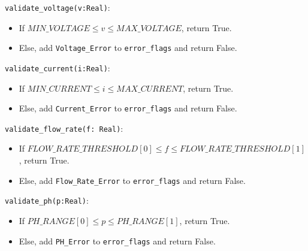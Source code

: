 \documentclass[12pt, titlepage]{article}
\begin{document}
\begin{description}
\begin{description}
\begin{description}
  \item[Access Routine Semantics:]
  \item
  \lstinline{validate_voltage(v:Real)}:
  \item
  \begin{itemize}
    \item If $MIN\_VOLTAGE \leq v \leq MAX\_VOLTAGE$, return True.
  \end{itemize}
  \item
  \begin{itemize}
    \item Else, add \lstinline{Voltage_Error} to \lstinline{error_flags} and return False.
  \end{itemize}
  \item 

  \lstinline{validate_current(i:Real)}:
  \item
  \begin{itemize}
    \item If $MIN\_CURRENT \leq i \leq MAX\_CURRENT$, return True.
  \end{itemize}
  \item
  \begin{itemize}
    \item Else, add \lstinline{Current_Error} to \lstinline{error_flags} and return False.
  \end{itemize}
  \item 

  \lstinline{validate_flow_rate(f: Real)}:
  \item
  \begin{itemize}
    \item If $FLOW\_RATE\_THRESHOLD[0] \leq f \leq FLOW\_RATE\_THRESHOLD[1]$, return True.
  \end{itemize}
  \item
  \begin{itemize}
    \item Else, add \lstinline{Flow_Rate_Error} to \lstinline{error_flags} and return False.
  \end{itemize}
  \item 

  \lstinline{validate_ph(p:Real)}:
  \item
  \begin{itemize}
    \item If $PH\_RANGE[0] \leq p \leq PH\_RANGE[1]$, return True.
  \end{itemize}
  \item
  \begin{itemize}
    \item Else, add \lstinline{PH_Error} to \lstinline{error_flags} and return False.
  \end{itemize}
  \item 


\end{description}
\end{description}
\end{description}
\end{document}
